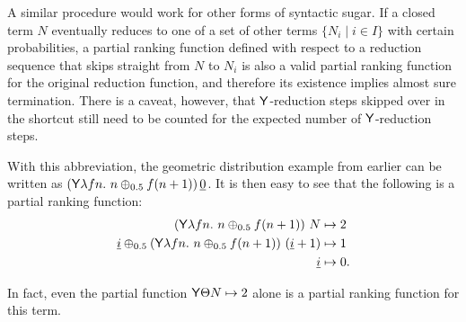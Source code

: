 A similar procedure would work for other forms of syntactic sugar. If a closed term $N$ eventually reduces to one of a set of other terms $\{N_i \mid i \in I\}$ with certain probabilities, a partial ranking function defined with respect to a reduction sequence that skips straight from $N$ to $N_i$ is also a valid partial ranking function for the original reduction function, and therefore its existence implies almost sure termination. There is a caveat, however, that $\mathsf{Y}$-reduction steps skipped over in the shortcut still need to be counted for the expected number of $\mathsf{Y}$-reduction steps.

With this abbreviation, the geometric distribution example from earlier can be written as $(\tY \lambda f n.\ n \oplus_{0.5} f(n+1)) \, \underline 0$. It is then easy to see that the following is a partial ranking function:
\begin{align*}
(\tY \lambda f n.\ n \oplus_{0.5} f(n+1))\ N & \mapsto 2 \\
\underline i \oplus_{0.5} (\tY \lambda f n.\ n \oplus_{0.5} f(n+1))\ (\underline i + 1) & \mapsto 1 \\
\underline i & \mapsto 0.
\end{align*}

In fact, even the partial function $\mathsf{Y} \Theta N \mapsto 2$ alone is a partial ranking function for this term.
